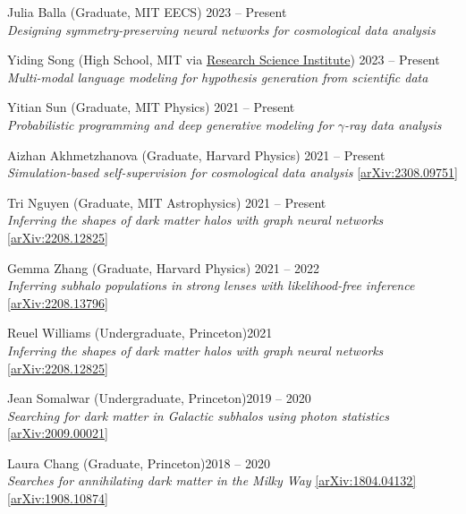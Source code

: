 \documentclass[letterpaper,11pt]{article}
\newenvironment{packed_itemize}{
\begin{itemize}[label=\raisebox{0.25ex}{\tiny$\bullet$}]
  \setlength{\itemsep}{4.2pt}
  \setlength{\parskip}{0pt}
  \setlength{\parsep}{0pt}}{\end{itemize}
}
\begin{document}
\begin{packed_itemize}
  \item Julia Balla (Graduate, {MIT EECS}) \hfill 2023 -- Present \\ \emph{Designing symmetry-preserving neural networks for cosmological data analysis}
  \item Yiding Song (High School, {MIT} via \href{https://www.cee.org/programs/research-science-institute}{Research Science Institute}) \hfill 2023 -- Present \\ \emph{Multi-modal language modeling for hypothesis generation from scientific data}
  \item Yitian Sun (Graduate, {MIT Physics}) \hfill 2021 -- Present \\ \emph{Probabilistic programming and deep generative modeling for $\gamma$-ray data analysis}
  \item Aizhan Akhmetzhanova (Graduate, {Harvard Physics}) \hfill 2021 -- Present \\ \emph{Simulation-based self-supervision for cosmological data analysis} \href{https://arxiv.org/abs/2308.09751}{[arXiv:2308.09751]}
  \item Tri Nguyen (Graduate, {MIT Astrophysics}) \hfill 2021 -- Present \\ \emph{Inferring the shapes of dark matter halos with graph neural networks} \href{https://arxiv.org/abs/2208.12825}{[arXiv:2208.12825]}
  \item Gemma Zhang (Graduate, {Harvard Physics}) \hfill 2021 -- 2022 \\ \emph{Inferring subhalo populations in strong lenses with likelihood-free inference} \href{https://arxiv.org/abs/2208.13796}{[arXiv:2208.13796]}
  \item Reuel Williams (Undergraduate, {Princeton})\hfill 2021 \\ \emph{Inferring the shapes of dark matter halos with graph neural networks} \href{https://arxiv.org/abs/2208.12825}{[arXiv:2208.12825]}
  \item Jean Somalwar (Undergraduate, {Princeton})\hfill 2019 -- 2020 \\ \emph{Searching for dark matter in Galactic subhalos using photon statistics} \href{https://arxiv.org/abs/2009.00021}{[arXiv:2009.00021]}
  \item Laura Chang (Graduate, {Princeton})\hfill 2018 -- 2020 \\ \emph{Searches for annihilating dark matter in the Milky Way} \href{https://arxiv.org/abs/1804.04132}{[arXiv:1804.04132]}\,\href{https://arxiv.org/abs/1908.10874}{[arXiv:1908.10874]}
  \end{packed_itemize}
\vspace{2.0mm}
\end{document}
